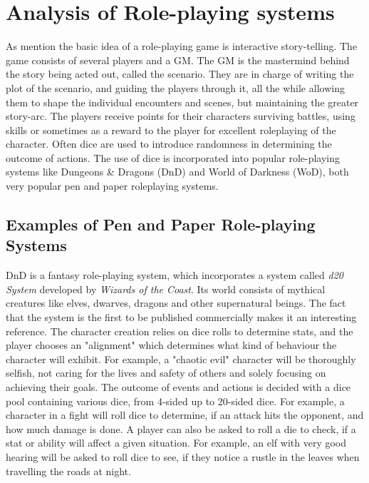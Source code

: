 \section{Analysis of Role-playing systems}

As mention the basic idea of a role-playing game is interactive story-telling. The game consists of several players and a GM. The GM is the mastermind behind the story being acted out, called the scenario. They are in charge of writing the plot of the scenario, and guiding the players through it, all the while allowing them to shape the individual encounters and scenes, but maintaining the greater story-arc. The players receive points for their characters surviving battles, using skills or sometimes as a reward to the player for excellent roleplaying of the character. Often dice are used to introduce randomness in determining the outcome of actions. The use of dice is incorporated into popular role-playing systems like Dungeons \& Dragons (DnD) and World of Darkness (WoD), both very popular pen and paper roleplaying systems.


\subsection{Examples of Pen and Paper Role-playing Systems}

DnD is a fantasy role-playing system, which incorporates a system called \emph{d20 System} developed by \emph{Wizards of the Coast}.
Its world consists of mythical creatures like elves, dwarves, dragons and other supernatural beings. The fact that the system is the first to be published commercially makes it an interesting reference. The character creation relies on dice rolls to determine stats, and the player chooses an "alignment" which determines what kind of behaviour the character will exhibit. For example, a "chaotic evil" character will be thoroughly selfish, not caring for the lives and safety of others and solely focusing on achieving their goals.
The outcome of events and actions is decided with a dice pool containing various dice, from 4-sided up to 20-sided dice. For example, a character in a fight will roll dice to determine, if an attack hits the opponent, and how much damage is done. A player can also be asked to roll a die to check, if a stat or ability will affect a given situation. For example, an elf with very good hearing will be asked to roll dice to see, if they notice a rustle in the leaves when travelling the roads at night.\cite{dnd}

